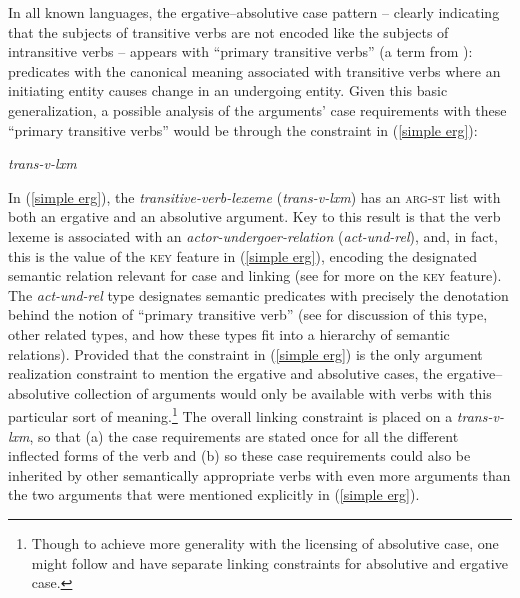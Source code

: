 \documentclass[output=paper,biblatex,babelshorthands,newtxmath,draftmode,colorlinks,citecolor=brown]{langscibook}
\begin{document}
In all known  languages, the ergative--absolutive case pattern -- clearly indicating that the subjects of transitive verbs are not encoded like the subjects of intransitive verbs -- appears with ``primary transitive verbs'' (a term from \citealt{andrews85,andrews072nded}): predicates with the canonical meaning associated with transitive verbs where an initiating entity causes change in an undergoing entity. Given this basic generalization, a possible analysis of the arguments' case requirements with these ``primary transitive verbs'' would be through the constraint in (\ref{simple erg}):
%
\begin{exe}
\ex\label{simple erg}
\emph{trans-v-lxm} \impl\\
\end{exe}
%
In (\ref{simple erg}), the \textit{transitive-verb-lexeme} (\textit{trans-v-lxm}) has an
\textsc{arg-st} list with both an ergative and an absolutive argument. Key to this result is that
the verb lexeme is associated with an \textit{actor-undergoer-relation} (\textit{act-und-rel}), and,
in fact, this is the value of the \textsc{key} feature in (\ref{simple erg}), encoding the
designated semantic relation relevant for case and linking (see \citealt{KD2006a-u} 
for more on the \textsc{key} feature). The \textit{act-und-rel} type designates semantic predicates with precisely
the denotation behind the notion of ``primary transitive verb'' (see \citealt[75--134]{Davis2001a-u}
for discussion of this type, other related types, and how these types fit into a hierarchy of
semantic relations). Provided that the constraint in (\ref{simple erg}) is the only argument
realization constraint to mention the ergative and absolutive cases, the ergative--absolutive
collection of arguments would only be available with verbs with this particular sort of
meaning.\footnote{Though to achieve more generality with the licensing of absolutive case, one might
  follow \citet[Chapter~7]{ball08thesis} and have separate linking constraints for absolutive and
  ergative case.} The overall linking constraint is placed on a \textit{trans-v-lxm}, so that (a)
the case requirements are stated once for all the different inflected forms of the verb and (b) so
these case requirements could also be inherited by other semantically appropriate verbs with even
more arguments than the two arguments that were mentioned explicitly in (\ref{simple erg}).
\end{document}
